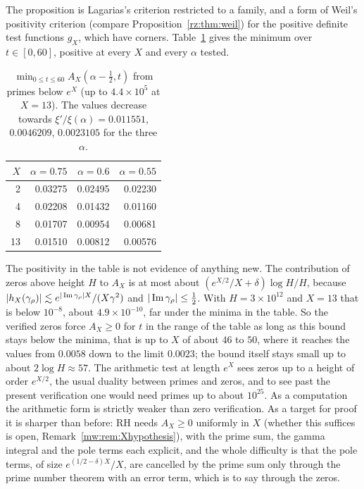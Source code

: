 The proposition is Lagarias's criterion restricted to a family, and a form of Weil's positivity criterion (compare Proposition~\ref{rz:thm:weil}) for the positive definite test functions $g_X$, which have corners. Table~\ref{mw:tab:AX} gives the minimum over $t\in[0,60]$, positive at every $X$ and every $\alpha$ tested.

\begin{table}[htbp]
\centering\small
\begin{tabular}{rrrr}
\toprule
$X$ & $\alpha=0.75$ & $\alpha=0.6$ & $\alpha=0.55$ \\
\midrule
2 & 0.03275 & 0.02495 & 0.02230 \\
4 & 0.02208 & 0.01432 & 0.01160 \\
8 & 0.01707 & 0.00954 & 0.00681 \\
13 & 0.01510 & 0.00812 & 0.00576 \\
\bottomrule
\end{tabular}
\caption{$\min_{0\leq t\leq60}A_X(\alpha-\tfrac12,t)$ from primes below $e^X$ (up to $4.4\times10^5$ at $X=13$). The values decrease towards $\xi'/\xi(\alpha)=0.011551$, $0.0046209$, $0.0023105$ for the three $\alpha$.}
\label{mw:tab:AX}
\end{table}

The positivity in the table is not evidence of anything new. The contribution of zeros above height $H$ to $A_X$ is at most about $(e^{X/2}/X+\delta)\log H/H$, because $|h_X(\gamma_\rho)|\lesssim e^{|\operatorname{Im}\gamma_\rho|X}/(X\gamma^2)$ and $|\operatorname{Im}\gamma_\rho|\leq\tfrac12$. With $H=3\times10^{12}$ and $X=13$ that is below $10^{-8}$, about $4.9\times10^{-10}$, far under the minima in the table. So the verified zeros force $A_X\geq0$ for $t$ in the range of the table as long as this bound stays below the minima, that is up to $X$ of about $46$ to $50$, where it reaches the values from $0.0058$ down to the limit $0.0023$; the bound itself stays small up to about $2\log H\approx57$. The arithmetic test at length $e^X$ sees zeros up to a height of order $e^{X/2}$, the usual duality between primes and zeros, and to see past the present verification one would need primes up to about $10^{25}$. As a computation the arithmetic form is strictly weaker than zero verification. As a target for proof it is sharper than before: RH needs $A_X\geq0$ uniformly in $X$ (whether this suffices is open, Remark~\ref{mw:rem:Xhypothesis}), with the prime sum, the gamma integral and the pole terms each explicit, and the whole difficulty is that the pole terms, of size $e^{(1/2-\delta)X}/X$, are cancelled by the prime sum only through the prime number theorem with an error term, which is to say through the zeros.


